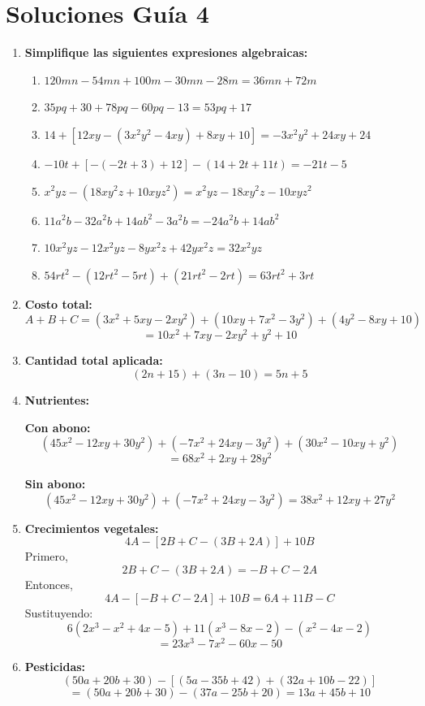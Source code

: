 \documentclass[12pt]{article}
\begin{document}
	
	\centering \section*{Soluciones Guía 4}
	
\begin{enumerate}
	
	\item \textbf{Simplifique las siguientes expresiones algebraicas:}
	\begin{enumerate}[label=\alph*)]
		\item $120mn - 54mn + 100m - 30mn - 28m = 36mn + 72m$
		\item $35pq + 30 + 78pq - 60pq - 13 = 53pq + 17$
		\item $14 + [12xy - (3x^2y^2 - 4xy) + 8xy + 10] = -3x^2y^2 + 24xy + 24$
		\item $-10t + [-(-2t + 3) + 12] - (14 + 2t + 11t) = -21t - 5$
		\item $x^2yz - (18xy^2z + 10xyz^2) = x^2yz - 18xy^2z - 10xyz^2$
		\item $11a^2b - 32a^2b + 14ab^2 - 3a^2b = -24a^2b + 14ab^2$
		\item $10x^2yz - 12x^2yz - 8yx^2z + 42yx^2z = 32x^2yz$
		\item $54rt^2 - (12rt^2 - 5rt) + (21rt^2 - 2rt) = 63rt^2 + 3rt$
	\end{enumerate}
	
	\item \textbf{Costo total:}
	\[
	A+B+C=(3x^2+5xy-2xy^2)+(10xy+7x^2-3y^2)+(4y^2-8xy+10)
	\]
	\[
	=10x^2+7xy-2xy^2+y^2+10
	\]
	
	\item \textbf{Cantidad total aplicada:}
	\[
	(2n+15)+(3n-10)=5n+5
	\]
	
	\item \textbf{Nutrientes:}
	
	\textbf{Con abono:}
	\[
	(45x^2-12xy+30y^2)+(-7x^2+24xy-3y^2)+(30x^2-10xy+y^2)
	\]
	\[
	=68x^2+2xy+28y^2
	\]
	
	\textbf{Sin abono:}
	\[
	(45x^2-12xy+30y^2)+(-7x^2+24xy-3y^2)=38x^2+12xy+27y^2
	\]
	
	\item \textbf{Crecimientos vegetales:}
	\[
	4A-[2B+C-(3B+2A)]+10B
	\]
	Primero,
	\[
	2B+C-(3B+2A)=-B+C-2A
	\]
	Entonces,
	\[
	4A-[-B+C-2A]+10B=6A+11B-C
	\]
	Sustituyendo:
	\[
	6(2x^3-x^2+4x-5)+11(x^3-8x-2)-(x^2-4x-2)
	\]
	\[
	=23x^3-7x^2-60x-50
	\]
	
	\item \textbf{Pesticidas:}
	\[
	(50a+20b+30)-[(5a-35b+42)+(32a+10b-22)]
	\]
	\[
	=(50a+20b+30)-(37a-25b+20)=13a+45b+10
	\]
	

\end{enumerate}
\end{document}
